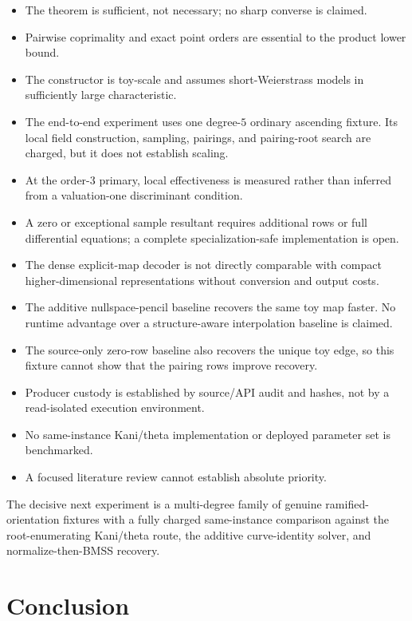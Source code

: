 \documentclass[11pt]{article}
\begin{document}
\begin{itemize}[leftmargin=*]
\item The theorem is sufficient, not necessary; no sharp converse is claimed.
\item Pairwise coprimality and exact point orders are essential to the product
      lower bound.
\item The constructor is toy-scale and assumes short-Weierstrass models in
      sufficiently large characteristic.
\item The end-to-end experiment uses one degree-$5$ ordinary ascending
      fixture.  Its local field construction, sampling, pairings, and
      pairing-root search are charged, but it does not establish scaling.
\item At the order-$3$ primary, local effectiveness is measured rather than
      inferred from a valuation-one discriminant condition.
\item A zero or exceptional sample resultant requires additional rows or full
      differential equations; a complete specialization-safe implementation
      is open.
\item The dense explicit-map decoder is not directly comparable with compact
      higher-dimensional representations without conversion and output costs.
\item The additive nullspace-pencil baseline recovers the same toy map faster.
      No runtime advantage over a structure-aware interpolation baseline is
      claimed.
\item The source-only zero-row baseline also recovers the unique toy edge, so
      this fixture cannot show that the pairing rows improve recovery.
\item Producer custody is established by source/API audit and hashes, not by a
      read-isolated execution environment.
\item No same-instance Kani/theta implementation or deployed parameter set is
      benchmarked.
\item A focused literature review cannot establish absolute priority.
\end{itemize}

The decisive next experiment is a multi-degree family of genuine
ramified-orientation fixtures with a fully charged same-instance comparison
against the root-enumerating Kani/theta route, the additive curve-identity
solver, and normalize-then-BMSS recovery.

\section{Conclusion}
\end{document}
